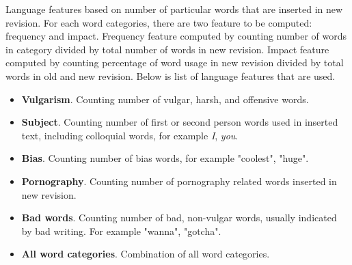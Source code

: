 Language features based on number of particular words that are inserted in new
revision.
For each word categories, there are two feature to be computed: frequency and
impact.
Frequency feature computed by counting number of words in category divided by
total number of words in new revision.
Impact feature computed by counting percentage of word usage in new revision
divided by total words in old and new revision.
Below is list of language features that are used.

\begin{itemize}
\item \textbf{Vulgarism}. Counting number of vulgar, harsh, and offensive
words.
\item \textbf{Subject}. Counting number of first or second person
words used in inserted text, including colloquial words, for example
\textit{I}, \textit{you}.
\item \textbf{Bias}. Counting number of bias words, for example "coolest",
"huge".
\item \textbf{Pornography}. Counting number of pornography related words
inserted in new revision.
\item \textbf{Bad words}. Counting number of bad, non-vulgar words, usually
indicated by bad writing. For example "wanna", "gotcha".
\item \textbf{All word categories}. Combination of all word categories.
\end{itemize}
